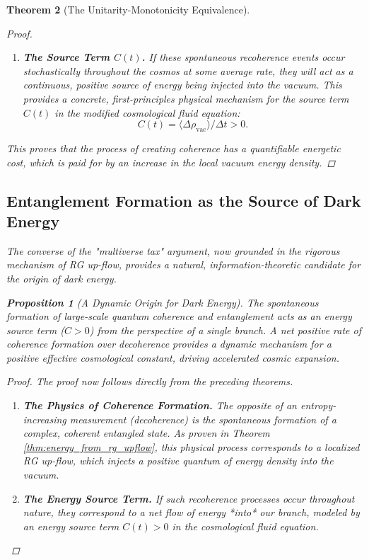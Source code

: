 \documentclass[11pt, letterpaper]{report}
\theoremstyle{plain} %
\newtheorem{theorem}{Theorem}[chapter]
\newtheorem{proposition}[theorem]{Proposition}
\theoremstyle{definition} %
\theoremstyle{remark} %
\begin{document}
\begin{theorem}[The Unitarity-Monotonicity Equivalence]
\begin{proof}
\begin{enumerate}
    \item \textbf{The Source Term $C(t)$.} If these spontaneous recoherence events occur stochastically throughout the cosmos at some average rate, they will act as a continuous, positive source of energy being injected into the vacuum. This provides a concrete, first-principles physical mechanism for the source term $C(t)$ in the modified cosmological fluid equation:
    \begin{equation}
        C(t) = \langle \Delta \rho_{\text{vac}} \rangle / \Delta t > 0.
    \end{equation}
\end{enumerate}
This proves that the process of creating coherence has a quantifiable energetic cost, which is paid for by an increase in the local vacuum energy density.
\end{proof}

\subsection{Entanglement Formation as the Source of Dark Energy}
\label{subsec:explore_dark_energy_revised}

The converse of the "multiverse tax" argument, now grounded in the rigorous mechanism of RG up-flow, provides a natural, information-theoretic candidate for the origin of dark energy.

\begin{proposition}[A Dynamic Origin for Dark Energy]
\label{prop:explore_dark_energy_revised}
The spontaneous formation of large-scale quantum coherence and entanglement acts as an energy source term ($C > 0$) from the perspective of a single branch. A net positive rate of coherence formation over decoherence provides a dynamic mechanism for a positive effective cosmological constant, driving accelerated cosmic expansion.
\end{proposition}
\begin{proof}
The proof now follows directly from the preceding theorems.
\begin{enumerate}
    \item \textbf{The Physics of Coherence Formation.} The opposite of an entropy-increasing measurement (decoherence) is the spontaneous formation of a complex, coherent entangled state. As proven in Theorem \ref{thm:energy_from_rg_upflow}, this physical process corresponds to a localized RG up-flow, which injects a positive quantum of energy density into the vacuum.

    \item \textbf{The Energy Source Term.} If such recoherence processes occur throughout nature, they correspond to a net flow of energy *into* our branch, modeled by an energy source term $C(t) > 0$ in the cosmological fluid equation.


\end{enumerate}
\end{proof}
\end{theorem}
\end{document}
